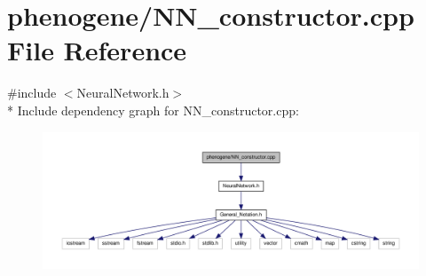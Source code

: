 \hypertarget{a00016}{\section{phenogene/\-N\-N\-\_\-constructor.cpp File Reference}
\label{d7/d7a/a00016}
}
{\ttfamily \#include $<$Neural\-Network.\-h$>$}\\*
Include dependency graph for N\-N\-\_\-constructor.\-cpp\-:\nopagebreak
\begin{figure}[H]
\begin{center}
\leavevmode
\includegraphics[width=350pt]{d8/d41/a00038}
\end{center}
\end{figure}
